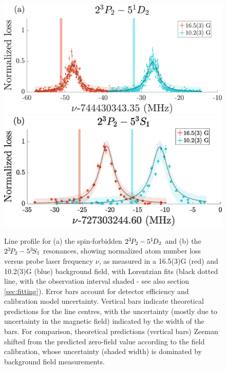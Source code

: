 \begin{figure}
      \includegraphics[width=\textwidth]{fig/spectroscopy/ci-plot-51D2.pdf}
    \includegraphics[width=\textwidth]{fig/spectroscopy/ci-plot-53S1}
   \caption{Line profile for (a) the spin-forbidden $2^{3\!}P_2 -  5^{1\!}D_2$  and (b) the $2^{3\!} P_2 - 5^{3\!} S_1$  resonances, showing normalized atom number loss versus probe laser frequency $\nu$, as measured in a {16.5(3)}G (red) and {10.2(3)}G (blue) background field, with Lorentzian fits (black dotted line, with the observation interval shaded - see also section \ref{sec:fitting}).
	Error bars account for detector efficiency and calibration model uncertainty. 
	Vertical bars indicate theoretical predictions for the line centres, with the uncertainty (mostly due to uncertainty in the magnetic field) indicated by the width of the bars.
	For comparison, theoretical predictions (vertical bars) Zeeman shifted from the predicted zero-field value \cite{Drake07} according to the field calibration, whose uncertainty (shaded width) is dominated by background field measurements.}
    \label{fig:simple_lines}

\end{figure}


